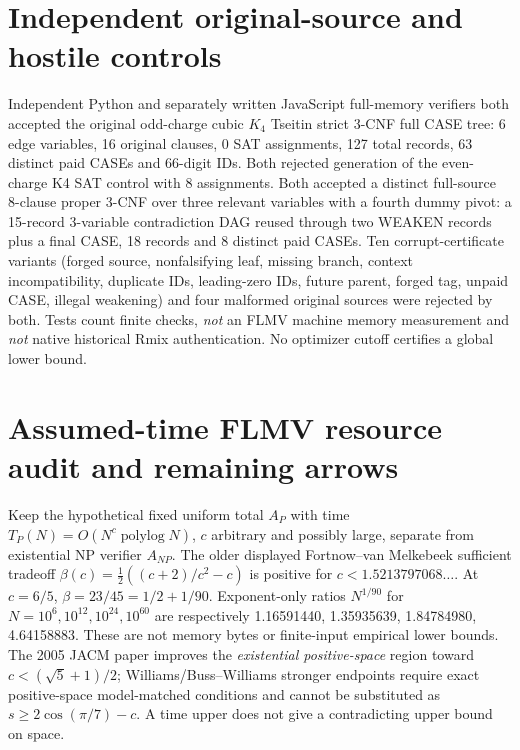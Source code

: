 \documentclass[11pt]{article}
\begin{document}
\section{Independent original-source and hostile controls}
Independent Python and separately written JavaScript full-memory verifiers both accepted the original odd-charge cubic $K_4$ Tseitin strict 3-CNF full CASE tree: 6 edge variables, 16 original clauses, 0 SAT assignments, 127 total records, 63 distinct paid CASEs and 66-digit IDs. Both rejected generation of the even-charge K4 SAT control with 8 assignments. Both accepted a distinct full-source 8-clause proper 3-CNF over three relevant variables with a fourth dummy pivot: a 15-record 3-variable contradiction DAG reused through two WEAKEN records plus a final CASE, 18 records and 8 distinct paid CASEs. Ten corrupt-certificate variants (forged source, nonfalsifying leaf, missing branch, context incompatibility, duplicate IDs, leading-zero IDs, future parent, forged tag, unpaid CASE, illegal weakening) and four malformed original sources were rejected by both. Tests count finite checks, \emph{not} an FLMV machine memory measurement and \emph{not} native historical Rmix authentication. No optimizer cutoff certifies a global lower bound.

\section{Assumed-time FLMV resource audit and remaining arrows}
Keep the hypothetical fixed uniform total $A_P$ with time $T_P(N)=O(N^c\operatorname{polylog}N)$, $c$ arbitrary and possibly large, separate from existential NP verifier $A_{NP}$. The older displayed Fortnow--van Melkebeek sufficient tradeoff $\beta(c)=\tfrac12((c+2)/c^2-c)$ is positive for $c<1.5213797068\ldots$. At $c=6/5$, $\beta=23/45=1/2+1/90$. Exponent-only ratios $N^{1/90}$ for $N=10^6,10^{12},10^{24},10^{60}$ are respectively 1.16591440, 1.35935639, 1.84784980, 4.64158883. These are not memory bytes or finite-input empirical lower bounds. The 2005 JACM paper improves the \emph{existential positive-space} region toward $c<(\sqrt5+1)/2$; Williams/Buss--Williams stronger endpoints require exact positive-space model-matched conditions and cannot be substituted as $s\ge2\cos(\pi/7)-c$. A time upper does not give a contradicting upper bound on space.
\end{document}
